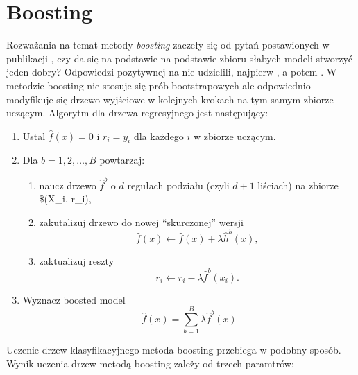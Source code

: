 \documentclass[]{book}
\providecommand{\tightlist}{%
  \setlength{\itemsep}{0pt}\setlength{\parskip}{0pt}}
\theoremstyle{plain}
\theoremstyle{definition}
\begin{document}
\hypertarget{boosting}{%
\section{Boosting}\label{boosting}}

Rozważania na temat metody \emph{boosting} zaczeły się od pytań postawionych w publikacji \citet{Kearns1989}, czy da się na podstawie na podstawie zbioru słabych modeli stworzyć jeden dobry? Odpowiedzi pozytywnej na nie udzielili, najpierw \citet{Schapire1990}, a potem \citet{breiman1998}. W metodzie boosting nie stosuje się prób bootstrapowych ale odpowiednio modyfikuje się drzewo wyjściowe w kolejnych krokach na tym samym zbiorze uczącym. Algorytm dla drzewa regresyjnego jest następujący:

\begin{enumerate}
\def\labelenumi{\arabic{enumi}.}
\tightlist
\item
  Ustal \(\hat{f}(x)=0\) i \(r_i=y_i\) dla każdego \(i\) w zbiorze uczącym.
\item
  Dla \(b=1,2,\ldots, B\) powtarzaj:

  \begin{enumerate}
  \def\labelenumii{\alph{enumii})}
  \tightlist
  \item
    naucz drzewo \(\hat{f}^b\) o \(d\) regułach podziału (czyli \(d+1\) liściach) na zbiorze \$(X\_i, r\_i),
  \item
    zakutalizuj drzewo do nowej ``skurczonej'' wersji
    \begin{equation}
     \hat{f}(x)\leftarrow \hat{f}(x)+\lambda\hat{h}^b(x),
    \end{equation}
  \item
    zaktualizuj reszty
    \begin{equation}
     r_i\leftarrow r_i-\lambda\hat{f}^b(x_i).
    \end{equation}
  \end{enumerate}
\item
  Wyznacz boosted model
  \begin{equation}
    \hat{f}(x) = \sum_{b=1}^B\lambda\hat{f}^b(x)
  \end{equation}
\end{enumerate}

Uczenie drzew klasyfikacyjnego metoda boosting przebiega w podobny sposób. Wynik uczenia drzew metodą boosting zależy od trzech paramtrów:
\end{document}

